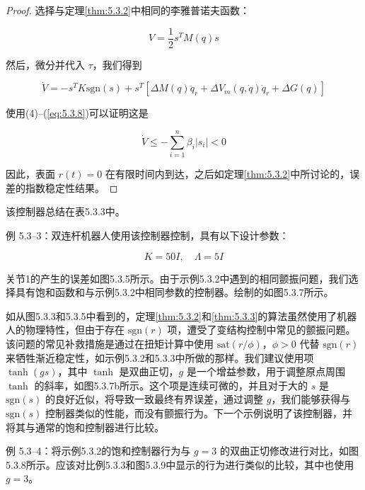 \documentclass[UTF8,12pt,a4paper]{ctexart}
\begin{document}
\begin{proof}
选择与定理\ref{thm:5.3.2}中相同的李雅普诺夫函数：

\begin{equation}
V = \frac{1}{2}s^T M(q)s
\end{equation}

然后，微分并代入 $\tau$，我们得到

\begin{equation}
\dot{V} = -s^T K \text{sgn}(s) + s^T[\Delta M(q)\ddot{q}_r + \Delta V_m(q, \dot{q})\dot{q}_r + \Delta G(q)]
\end{equation}

使用(4)--(\ref{eq:5.3.8})可以证明这是

\begin{equation}
\dot{V} \leq -\sum_{i=1}^{n}\beta_i|s_i| < 0
\end{equation}

因此，表面 $r(t) = 0$ 在有限时间内到达，之后如定理\ref{thm:5.3.2}中所讨论的，误差的指数稳定性结果。
\end{proof}

该控制器总结在表5.3.3中。

\begin{example}[VSS控制器 2（饱和）]
例 5.3--3：双连杆机器人使用该控制器控制，具有以下设计参数：

\begin{equation}
K = 50I, \quad \Lambda = 5I
\end{equation}

关节1的产生的误差如图5.3.5所示。由于示例5.3.2中遇到的相同颤振问题，我们选择具有饱和函数和与示例5.3.2中相同参数的控制器。绘制的如图5.3.7所示。
\end{example}

如从图5.3.3和5.3.5中看到的，定理\ref{thm:5.3.2}和\ref{thm:5.3.3}的算法虽然使用了机器人的物理特性，但由于存在 $\text{sgn}(r)$ 项，遭受了变结构控制中常见的颤振问题。该问题的常见补救措施是通过在扭矩计算中使用 $\text{sat}(r/\phi)$，$\phi > 0$ 代替 $\text{sgn}(r)$ 来牺牲渐近稳定性，如示例5.3.2和5.3.3中所做的那样。我们建议使用项 $\tanh(gs)$，其中 $\tanh$ 是双曲正切，$g$ 是一个增益参数，用于调整原点周围 $\tanh$ 的斜率，如图5.3.7b所示。这个项是连续可微的，并且对于大的 $s$ 是 $\text{sgn}(s)$ 的良好近似，将导致一致最终有界误差，通过调整 $g$，我们能够获得与 $\text{sgn}(s)$ 控制器类似的性能，而没有颤振行为。下一个示例说明了该控制器，并将其与通常的饱和控制器进行比较。

\begin{example}
例 5.3--4：将示例5.3.2的饱和控制器行为与 $g = 3$ 的双曲正切修改进行对比，如图5.3.8所示。应该对比例5.3.3和图5.3.9中显示的行为进行类似的比较，其中也使用 $g = 3$。
\end{example}
\end{document}
